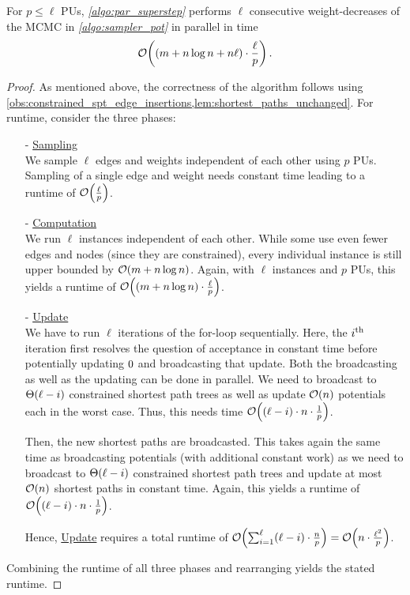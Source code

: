 \begin{theorem}
    For $p \leq \ell$ PUs, \emph{\cref{algo:par_superstep}} performs $\ell$ consecutive weight-decreases of the MCMC in \emph{\cref{algo:sampler_pot}} in parallel in time \[
        \mathcal O\!\left(\left(m + n\log n + n\ell\right) \cdot \frac{\ell}{p}\right).
    \]
\end{theorem}
\begin{proof}
    As mentioned above, the correctness of the algorithm follows using \cref{obs:constrained_spt_edge_insertions,lem:shortest_paths_unchanged}.
    For runtime, consider the three phases: \begin{itemize}
        \item[-] \underline{Sampling} \\
            We sample $\ell$ edges and weights independent of each other using $p$ PUs. 
            Sampling of a single edge and weight needs constant time leading to a runtime of $\mathcal O\!\left(\frac{\ell}{p}\right)$.
        \item[-] \underline{Computation} \\
            We run $\ell$ \algdk instances independent of each other. 
            While some use even fewer edges and nodes (since they are constrained), every individual \algdk instance is still upper bounded by $\mathcal O\!\left(m + n\log n\right)$. 
            Again, with $\ell$ instances and $p$ PUs, this yields a runtime of $\mathcal O\!\left((m + n\log n) \cdot \frac{\ell}{p}\right)$.
        \item[-] \underline{Update} \\ 
            We have to run $\ell$ iterations of the for-loop sequentially. 
            Here, the $i\textsuperscript{\textup{th}}$ iteration first resolves the question of acceptance in constant time before potentially updating $\pot$ and broadcasting that update. 
            Both the broadcasting as well as the updating can be done in parallel. 
            We need to broadcast to $\Theta\!\left(\ell - i\right)$ constrained shortest path trees as well as update $\mathcal O\!\left(n\right)$ potentials each in the worst case.
            Thus, this needs time $\mathcal O\!\left((\ell - i) \cdot n \cdot \frac{1}{p}\right)$.

            Then, the new shortest paths are broadcasted.
            This takes again the same time as broadcasting potentials (with additional constant work) as we need to broadcast to $\Theta\!\left(\ell - i\right)$ constrained shortest path trees and update at most $\mathcal O\!\left(n\right)$ shortest paths in constant time.
            Again, this yields a runtime of $\mathcal O\!\left((\ell - i) \cdot n \cdot \frac{1}{p}\right)$.

            Hence, \underline{Update} requires a total runtime of $\mathcal O\!\left(\sum_{i = 1}^{\ell}(\ell - i) \cdot \frac{n}{p}\right) = \mathcal O\!\left(n \cdot \frac{\ell^2}{p}\right)$.
    \end{itemize}
    Combining the runtime of all three phases and rearranging yields the stated runtime.
\end{proof}

